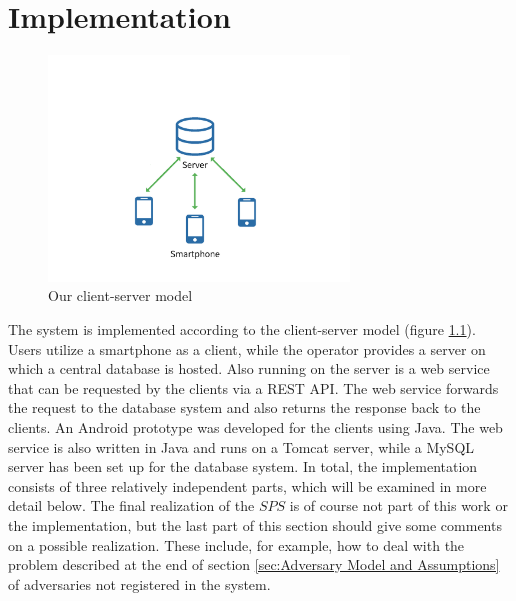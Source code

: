 \chapter{Implementation}
\label{ch:Implementation}
\begin{figure}
	\centering
	\includegraphics[height=6cm]{logos/client-server.png}
	\caption{Our client-server model}
	\label{img:client-server}
\end{figure}
The system is implemented according to the client-server model (figure \ref{img:client-server}). Users utilize a smartphone as a client, while the operator provides a server on which a central database is hosted. Also running on the server is a web service that can be requested by the clients via a REST API. The web service forwards the request to the database system and also returns the response back to the clients. An Android prototype was developed for the clients using Java. The web service is also written in Java and runs on a Tomcat server, while a MySQL server has been set up for the database system. In total, the implementation consists of three relatively independent parts, which will be examined in more detail below. The final realization of the $SPS$ is of course not part of this work or the implementation, but the last part of this section should give some comments on a possible realization. These include, for example, how to deal with the problem described at the end of section \ref{sec:Adversary Model and Assumptions} of adversaries not registered in the system.

